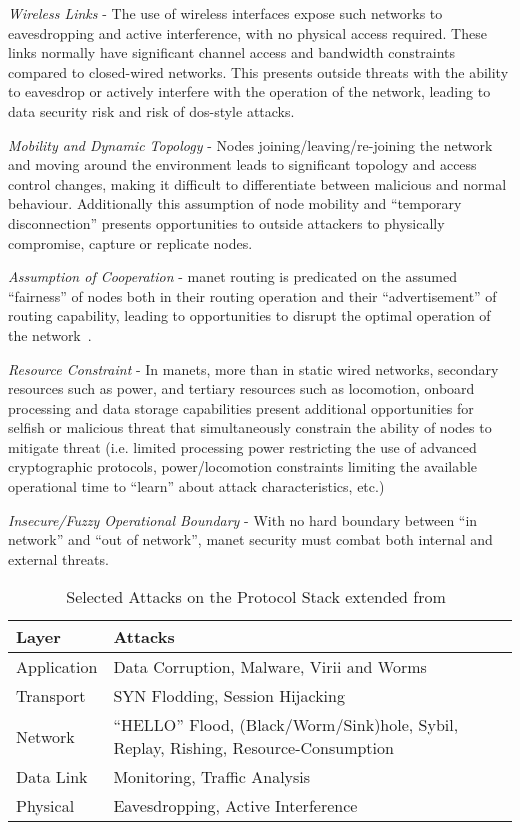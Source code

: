 \emph{Wireless Links} - The use of wireless interfaces expose such networks to eavesdropping and active interference, with no physical access required.
These links normally have significant channel access and bandwidth constraints compared to closed-wired networks.
This presents outside threats with the ability to eavesdrop or actively interfere with the operation of the network, leading to data security risk and risk of \gls{dos}-style attacks.

\emph{Mobility and Dynamic Topology} - Nodes joining/leaving/re-joining the network and moving around the environment leads to significant topology and access control changes, making it difficult to differentiate between malicious and normal behaviour.
Additionally this assumption of node mobility and ``temporary disconnection'' presents opportunities to outside attackers to physically compromise, capture or replicate nodes.

\emph{Assumption of Cooperation} - \gls{manet} routing is predicated on the assumed ``fairness'' of nodes both in their routing operation and their ``advertisement'' of routing capability, leading to opportunities to disrupt the optimal operation of the network~\cite{Papadimitratos2002}.

\emph{Resource Constraint} - In \glspl{manet}, more than in static wired networks, secondary resources such as power, and tertiary resources such as locomotion, onboard processing and data storage capabilities present additional opportunities for selfish or malicious threat that simultaneously constrain the ability of nodes to mitigate threat (i.e. limited processing power restricting the use of advanced cryptographic protocols, power/locomotion constraints limiting the available operational time to ``learn'' about attack characteristics, etc.)

\emph{Insecure/Fuzzy Operational Boundary} - With no hard boundary between ``in network'' and ``out of network'', \gls{manet} security must combat both internal and external threats.



\begin{table}
  \caption[Selected Attacks on the Protocol Stack]{Selected Attacks on the Protocol Stack extended from~\citet{csen2010security}}
  \label{tab:stack_attacks}
  \begin{tabularx}{\textwidth}{p{5cm} X}\toprule
    Layer & Attacks\\\midrule
    Application & Data Corruption, Malware, Virii and Worms\\
    Transport & SYN Flodding, Session Hijacking\\
    Network & ``HELLO'' Flood, (Black/Worm/Sink)hole, Sybil, Replay, Rishing, Resource-Consumption\\
    Data Link & Monitoring, Traffic Analysis\\
    Physical& Eavesdropping, Active Interference\\\bottomrule
  \end{tabularx}
\end{table}

